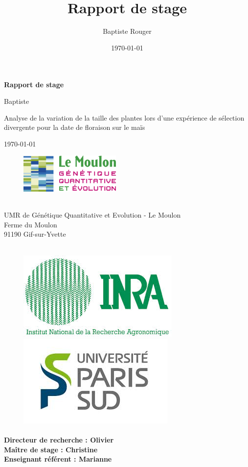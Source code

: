 \documentclass[12pt,a4paper]{report}
\author{Baptiste Rouger}
\title{Rapport de stage}
\date{\today}
\begin{document}
	\begin{titlepage}
		
		\begin{center}
			\vfill
			
			{\Huge \textbf{Rapport de stage}}
			
			\vfill
			
			{\LARGE Baptiste }
			
			\vfill
			
			{\Huge Analyse de la variation de la taille des plantes lors d'une expérience de sélection divergente pour la date de floraison sur le maïs}
			
			\vfill
			
			{\large\today}
			
			\vfill
			\end{center}
			
			\begin{figure}
				\includegraphics[width=5cm]{logo.jpg}
			\end{figure} ~\\ %
			UMR de Génétique Quantitative et Evolution - Le Moulon\\
			Ferme du Moulon\\
			91190 Gif-sur-Yvette \\ \\
			
			\begin{figure}[h]
				\centering
				\includegraphics[width = 4 cm]{inra.jpg}
				\includegraphics[width = 4 cm]{upsud.jpg}
			\end{figure}
			
			\paragraph*{Directeur de recherche : Olivier  \\
			Maître de stage : Christine \\
			Enseignant référent : Marianne  }
			\vfill
	\end{titlepage}
	
\end{document}
